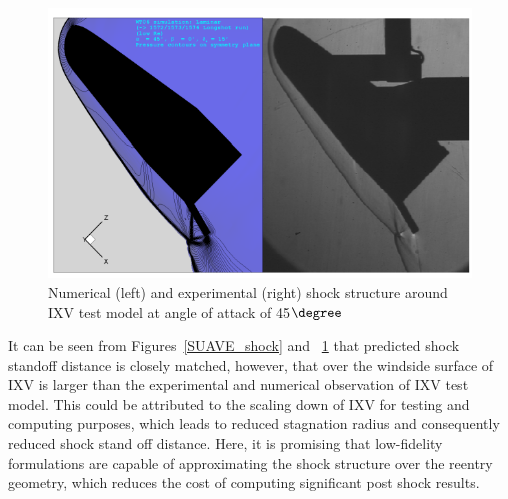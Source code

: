 \documentclass[%
 aip,
 amsmath,amssymb,
preprint,%
]{revtex4-1}
\begin{document}
\begin{figure}[h!]
\centering
\includegraphics[width=0.6\linewidth]{shock_validation.png}
\caption{Numerical (left) and experimental (right) shock structure around IXV test model at angle of attack of 45$\degree$ \cite{paris2011experimental}}
\label{valid_shock}
\end{figure}
It can be seen from Figures~\ref{SUAVE_shock} and ~\ref{valid_shock} that predicted shock standoff distance is closely matched, however, that over the windside surface of IXV is larger than the experimental and numerical observation of IXV test model. This could be attributed to the scaling down of IXV for testing and computing purposes, which leads to reduced stagnation radius and consequently reduced shock stand off distance. Here, it is promising that low-fidelity formulations are capable of approximating the shock structure over the reentry geometry, which reduces the cost of computing significant post shock results.
\end{document}
